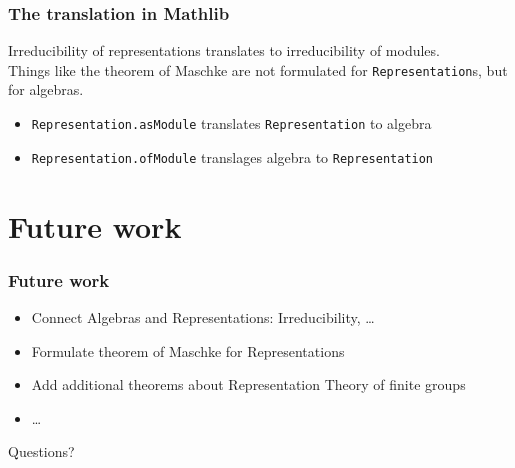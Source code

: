 \documentclass{beamer}
\begin{document}
\begin{frame}[fragile]
\frametitle{The translation in Mathlib}
Irreducibility of representations translates to irreducibility of modules.\\
\pause
Things like the theorem of Maschke are not formulated for \verb+Representation+s, but for algebras.\\
\pause
\vspace{1cm}
\begin{itemize}
\item \verb+Representation.asModule+ translates \verb+Representation+ to algebra
\item \verb+Representation.ofModule+ translages algebra to \verb+Representation+
\end{itemize}
\end{frame}


\section{Future work}
\begin{frame}
\frametitle{Future work}
\begin{itemize}
\pause
\item Connect Algebras and Representations: Irreducibility, \ldots
\pause
\item Formulate theorem of Maschke for Representations
\pause
\item Add additional theorems about Representation Theory of finite groups
\item \ldots
\end{itemize}
\end{frame}


\begin{frame}
\begin{center}
\huge Questions?
\end{center}
\end{frame}
\end{document}
